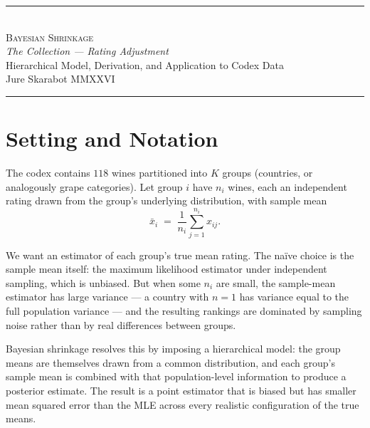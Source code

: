 \documentclass[11pt]{article}
\begin{document}
\thispagestyle{titlepage}

\begin{center}
    {\color{bordeaux}\rule{\textwidth}{0.4pt}}\\[0.6em]
    {\Large\scshape\color{bordeaux} Bayesian Shrinkage}\\[0.4em]
    {\itshape\color{bordeaux} The Collection --- Rating Adjustment}\\[0.4em]
    Hierarchical Model, Derivation, and Application to Codex Data\\[0.6em]
    Jure Skarabot \quad\textbullet\quad MMXXVI\\[0.4em]
    {\color{bordeaux}\rule{\textwidth}{0.4pt}}
\end{center}
\vspace{0.5em}

\section{Setting and Notation}

The codex contains $118$ wines partitioned into $K$ groups (countries, or
analogously grape categories). Let group $i$ have $n_i$ wines, each an
independent rating drawn from the group's underlying distribution, with
sample mean
\[
    \bar{x}_i \;=\; \frac{1}{n_i}\sum_{j=1}^{n_i} x_{ij}.
\]

We want an estimator of each group's true mean rating. The naïve choice is
the sample mean itself: the maximum likelihood estimator under independent
sampling, which is unbiased. But when some $n_i$ are small, the
sample-mean estimator has large variance --- a country with $n = 1$ has
variance equal to the full population variance --- and the resulting
rankings are dominated by sampling noise rather than by real differences
between groups.

Bayesian shrinkage resolves this by imposing a hierarchical model: the
group means are themselves drawn from a common distribution, and each
group's sample mean is combined with that population-level information to
produce a posterior estimate. The result is a point estimator that is
biased but has smaller mean squared error than the MLE across every
realistic configuration of the true means.
\end{document}
